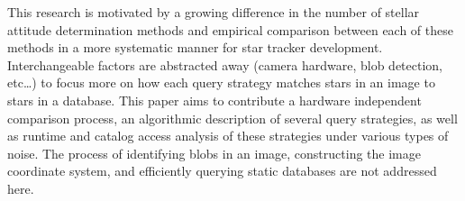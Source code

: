 

This research is motivated by a growing difference in the
number of stellar attitude determination methods and
empirical comparison between each of these methods in a more
systematic manner for star tracker development.
Interchangeable factors are abstracted away (camera
hardware, blob detection, etc\ldots) to focus more on how
each query strategy matches stars in an image to stars in a
database. This paper aims to contribute a hardware
independent comparison process, an algorithmic description
of several query strategies, as well as runtime and catalog
access analysis of these strategies under various types of
noise. The process of identifying blobs in an image,
constructing the image coordinate system, and efficiently
querying static databases are not addressed here.

